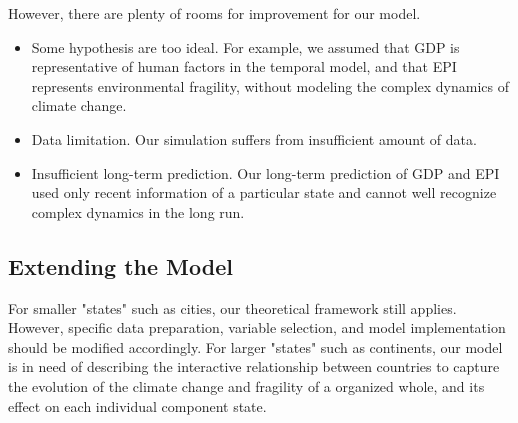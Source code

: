However, there are plenty of rooms for improvement for our model. 
\begin{itemize}
   \item Some hypothesis are too ideal. For example, we assumed that GDP is representative of human factors in the temporal model, and that EPI represents environmental fragility, without modeling the complex dynamics of climate change.
   \item Data limitation. Our simulation suffers from insufficient amount of data.
   \item Insufficient long-term prediction. Our long-term prediction of GDP and EPI used only recent information of a particular state and cannot well recognize complex dynamics in the long run.
\end{itemize}

\subsection{Extending the Model}

For smaller "states" such as cities, our theoretical framework still applies.
However, specific data preparation, variable selection, and model implementation should be modified accordingly. 
For larger "states" such as continents, our model is in need of describing the interactive relationship between countries to capture the evolution of the climate change and fragility of a organized whole, and its effect on each individual component state.


